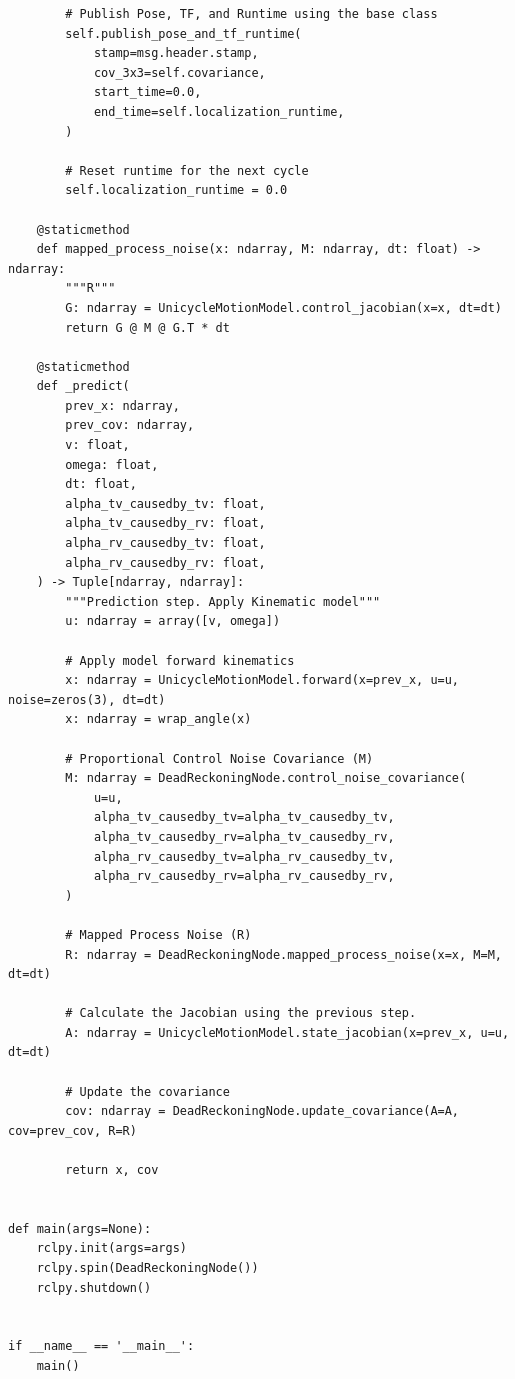 \begin{verbatim}
        # Publish Pose, TF, and Runtime using the base class
        self.publish_pose_and_tf_runtime(
            stamp=msg.header.stamp,
            cov_3x3=self.covariance,
            start_time=0.0,
            end_time=self.localization_runtime,
        )

        # Reset runtime for the next cycle
        self.localization_runtime = 0.0

    @staticmethod
    def mapped_process_noise(x: ndarray, M: ndarray, dt: float) -> ndarray:
        """R"""
        G: ndarray = UnicycleMotionModel.control_jacobian(x=x, dt=dt)
        return G @ M @ G.T * dt

    @staticmethod
    def _predict(
        prev_x: ndarray,
        prev_cov: ndarray,
        v: float,
        omega: float,
        dt: float,
        alpha_tv_causedby_tv: float,
        alpha_tv_causedby_rv: float,
        alpha_rv_causedby_tv: float,
        alpha_rv_causedby_rv: float,
    ) -> Tuple[ndarray, ndarray]:
        """Prediction step. Apply Kinematic model"""
        u: ndarray = array([v, omega])

        # Apply model forward kinematics
        x: ndarray = UnicycleMotionModel.forward(x=prev_x, u=u, noise=zeros(3), dt=dt)
        x: ndarray = wrap_angle(x)

        # Proportional Control Noise Covariance (M)
        M: ndarray = DeadReckoningNode.control_noise_covariance(
            u=u,
            alpha_tv_causedby_tv=alpha_tv_causedby_tv,
            alpha_tv_causedby_rv=alpha_tv_causedby_rv,
            alpha_rv_causedby_tv=alpha_rv_causedby_tv,
            alpha_rv_causedby_rv=alpha_rv_causedby_rv,
        )

        # Mapped Process Noise (R)
        R: ndarray = DeadReckoningNode.mapped_process_noise(x=x, M=M, dt=dt)

        # Calculate the Jacobian using the previous step.
        A: ndarray = UnicycleMotionModel.state_jacobian(x=prev_x, u=u, dt=dt)

        # Update the covariance
        cov: ndarray = DeadReckoningNode.update_covariance(A=A, cov=prev_cov, R=R)

        return x, cov


def main(args=None):
    rclpy.init(args=args)
    rclpy.spin(DeadReckoningNode())
    rclpy.shutdown()


if __name__ == '__main__':
    main()
\end{verbatim}

\newpage
